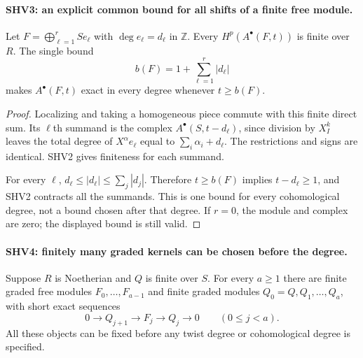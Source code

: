 \paragraph{SHV3: an explicit common bound for all shifts of a finite free module.}
\label{claim:SHV3}
Let $F=\bigoplus_{\ell=1}^r S e_\ell$ with $\deg e_\ell=d_\ell$
in $\mathbb Z$.  Every $H^p(A^\bullet(F,t))$ is finite over $R$.
The single bound
\[
                    b(F)=1+\sum_{\ell=1}^r|d_\ell|
                                                        \tag{SHV.8}
\]
makes $A^\bullet(F,t)$ exact in every degree whenever $t\ge b(F)$.

\begin{proof}
Localizing and taking a homogeneous piece commute with this finite
direct sum.  Its $\ell$th summand is the complex
$A^\bullet(S,t-d_\ell)$, since division by $X_I^k$ leaves the
total degree of $X^\alpha e_\ell$ equal to
$\sum_i\alpha_i+d_\ell$.  The restrictions and signs are identical.
SHV2 gives finiteness for each summand.

For every $\ell$,
$d_\ell\le|d_\ell|\le\sum_j|d_j|$.  Therefore
$t\ge b(F)$ implies $t-d_\ell\ge1$, and SHV2 contracts all the
summands.  This is one bound for every cohomological degree, not a
bound chosen after that degree.  If $r=0$, the module and complex
are zero; the displayed bound is still valid.
\end{proof}

\paragraph{SHV4: finitely many graded kernels can be chosen before the degree.}
\label{claim:SHV4}
Suppose $R$ is Noetherian and $Q$ is finite over $S$.
For every $a\ge1$ there are finite graded free modules
$F_0,\ldots,F_{a-1}$ and finite graded modules
$Q_0=Q,Q_1,\ldots,Q_a$, with short exact sequences
\[
 0\longrightarrow Q_{j+1}\longrightarrow F_j
       \longrightarrow Q_j\longrightarrow0
       \qquad(0\le j<a).                               \tag{SHV.9}
\]
All these objects can be fixed before any twist degree or
cohomological degree is specified.

